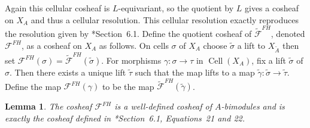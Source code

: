 \documentclass{amsart}
\DeclareMathOperator{\Cell}{Cell}
\newtheorem{lemma}[theorem]{Lemma}
\theoremstyle{remark}
\begin{document}
Again this cellular cosheaf is $L$-equivariant, so the quotient by $L$ gives a cosheaf on $X_A$ and thus a cellular resolution.
This cellular resolution exactly reproduces the resolution given by \cite{FH25}*{Section~6.1}.
Define the quotient cosheaf of $\widetilde{\mathcal{F}}^{FH}$, denoted $\mathcal{F}^{FH}$, as a cosheaf on $X_{A}$ as follows. On cells $\sigma$ of $X_A$ choose $\widetilde{\sigma}$ a lift to $X_{\widetilde{A}}$ then set $\mathcal{F}^{FH}(\sigma)=\widetilde{\mathcal{F}}^{FH}(\widetilde{\sigma})$. For morphisms $\gamma:\sigma\rightarrow \tau$ in $\Cell(X_A)$, fix a lift $\widetilde{\sigma}$ of $\sigma$. Then there exists a unique lift $\widetilde{\tau}$ such that the map lifts to a map $\widetilde{\gamma}:\widetilde{\sigma}\rightarrow \widetilde{\tau}$. Define the map $\mathcal{F}^{FH}(\gamma)$ to be the map $\widetilde{\mathcal{F}}^{FH}(\widetilde{\gamma})$.
\begin{lemma}
  \label{lem:FH-cosheaf-same}
  The cosheaf $\mathcal{F}^{FH}$ is a well-defined cosheaf of $A$-bimodules and is exactly the cosheaf defined in \cite{FH25}*{Section~6.1, Equations~21 and 22}.
\end{lemma}
\end{document}
